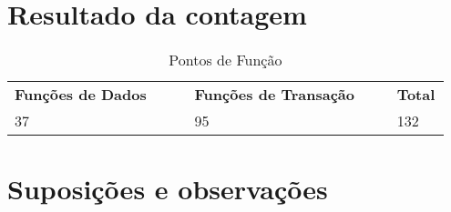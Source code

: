 \vfill
\pagebreak
\section{Resultado da contagem}

\begin{table*}[!h]
\centering
\caption{Pontos de Função}
\label{resultado_contagem}
  \begin{tabular}{|p{0.40\linewidth}|p{0.45\linewidth}|p{0.10\linewidth}|}
  \hline
  \textbf{Funções de Dados} & \textbf{Funções de Transação} & \textbf{Total} \\ 
  37 & 95 & 132\\
  \hline
 
  \end{tabular}
\end{table*}

\section{Suposições e observações}

